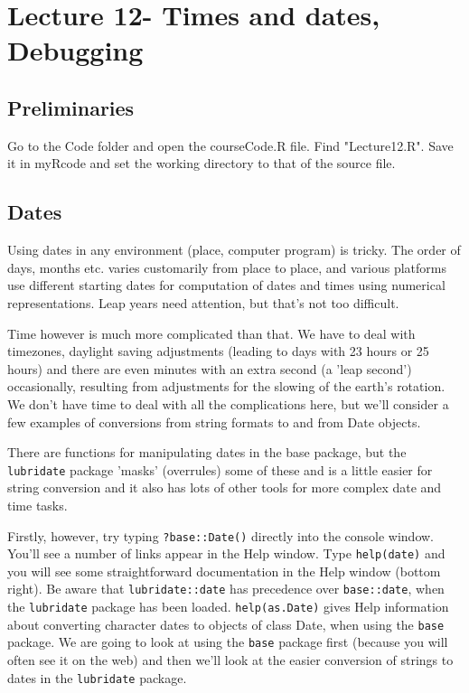\documentclass[titlepage]{book}\usepackage{knitr}
\begin{document}
\chapter{Lecture 12- Times and dates, Debugging}


\author{Brian Williams $<$\href{mailto:bjw649@gmail.com}%
{bjw649@gmail.com}$>$}


\section{Preliminaries}

Go to the Code folder and open the courseCode.R file.  Find "Lecture12.R". Save it in myRcode and set the working directory to that of the source file.


\section{Dates}

Using dates in any environment (place, computer program) is tricky.  The order of days, months etc. varies customarily from place to place, and various platforms use different starting dates for computation of dates and times using numerical representations. Leap years need attention, but that's not too difficult.  

Time however is much more complicated than that. We have to deal with timezones, daylight saving adjustments (leading to days with 23 hours or 25 hours) and there are even minutes with an extra second (a 'leap second') occasionally, resulting from adjustments for the slowing of the earth's rotation. We don't have time to deal with all the complications here, but we'll consider a few examples of conversions from string formats to and from Date objects.

There are functions for manipulating dates in the base package, but the \texttt{lubridate} package 'masks' (overrules) some of these and is a little easier for string conversion and it also has lots of other tools for more complex date and time tasks.

Firstly, however, try typing \texttt{?base::Date()} directly into the console window.
You'll see a number of links appear in the Help window. 
Type \texttt{help(date)} and you will see some straightforward documentation in the Help window (bottom right). Be aware that \texttt{lubridate::date} has precedence over \texttt{base::date}, when the \texttt{lubridate} package has been loaded. 
\texttt{help(as.Date)} gives Help information about converting character dates to objects of class Date, when using the \texttt{base} package.  We are going to look at using the \texttt{base} package first (because you will often see it on the web) and then we'll look at the easier conversion of strings to dates in the \texttt{lubridate} package. 
\end{document}
